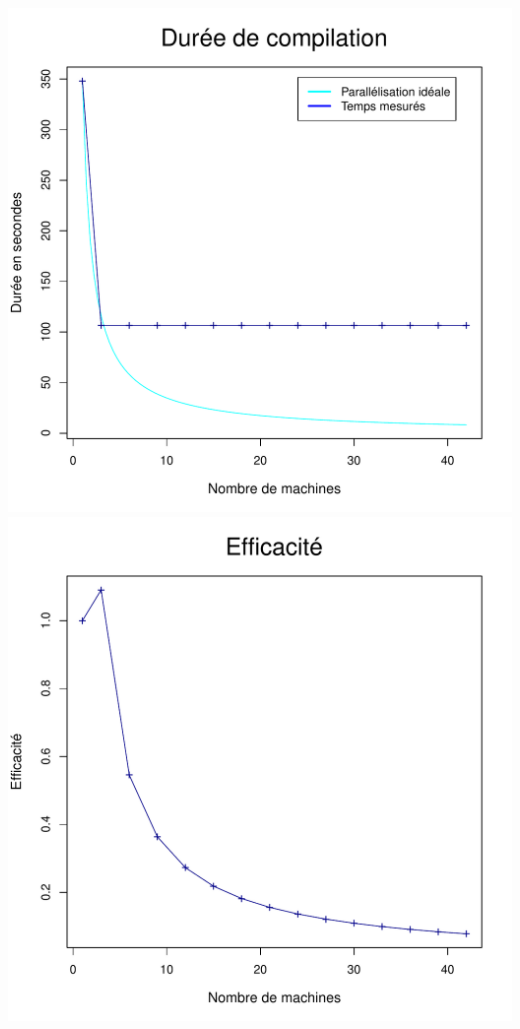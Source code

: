 \documentclass[a4paper, 11pt, titlepage]{article}
\begin{document}
\begin{center}
    \includegraphics[scale=0.45]{res/sujet_makefiles_premier_Makefile_nth8.pdf}
    \includegraphics[scale=0.45]{res/sujet_makefiles_premier_Makefile_nth8_eff.pdf}

\end{center}
\end{document}
